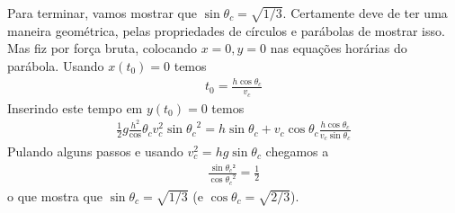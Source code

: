 \documentclass[letterpaper,10pt,english]{jupyterBook}
\begin{document}
\sphinxAtStartPar
Para terminar, vamos mostrar que \(\sin{\theta_c} = \sqrt{1/3}\). Certamente deve de ter uma maneira geométrica, pelas propriedades de círculos e parábolas de mostrar isso. Mas fiz por força bruta, colocando \(x=0, y=0\) nas equações horárias do parábola. Usando \(x(t_0) = 0\) temos
\begin{equation*}
\begin{split}
t_0 = \frac{h\cos{\theta_c}}{v_c}
\end{split}
\end{equation*}
\sphinxAtStartPar
Inserindo este tempo em \(y(t_0) = 0\) temos
\begin{equation*}
\begin{split}
\frac{1}{2}g \frac{h^2}\cos{\theta_c}{v_{c}^2\sin{\theta_c}^2} = h\sin{\theta_c} + v_c\cos{\theta_c}\frac{h\cos{\theta_c}}{v_{c}\sin{\theta_c}}
\end{split}
\end{equation*}
\sphinxAtStartPar
Pulando alguns passos e usando \(v_{c}^2 = hg\sin{\theta_c}\) chegamos a
\begin{equation*}
\begin{split}
\frac{\sin{\theta_c}²}{\cos{\theta_c}^2} = \frac{1}{2}
\end{split}
\end{equation*}
\sphinxAtStartPar
o que mostra que \(\sin{\theta_c} = \sqrt{1/3}\) (e \(\cos{\theta_c} = \sqrt{2/3}\)).







\renewcommand{\indexname}{Index}
\printindex
\end{document}
